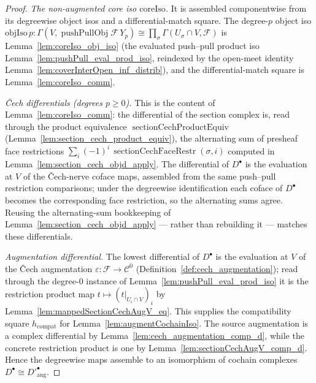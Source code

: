 \begin{proof}
  \emph{The non-augmented core iso \(\mathrm{coreIso}\).} It is assembled componentwise from
  its degreewise object isos and a differential-match square. The degree-\(p\) object iso
  \(\mathrm{objIso}\,p : \Gamma(V,
  \operatorname{pushPullObj}\mathcal{F}\,Y_p) \cong \prod_\sigma \Gamma(U_\sigma \cap V,
  \mathcal{F})\) is Lemma~\ref{lem:coreIso_obj_iso} (the evaluated push--pull product iso
  Lemma~\ref{lem:pushPull_eval_prod_iso}, reindexed by the open-meet identity
  Lemma~\ref{lem:coverInterOpen_inf_distrib}), and the differential-match square is
  Lemma~\ref{lem:coreIso_comm}.

  \emph{{\v C}ech differentials (degrees \(p \geq 0\)).} This is the content of
  Lemma~\ref{lem:coreIso_comm}: the differential of the section complex is, read through the
  product equivalence \(\operatorname{sectionCechProductEquiv}\)
  (Lemma~\ref{lem:section_cech_product_equiv}), the alternating sum of presheaf face
  restrictions \(\sum_i (-1)^i\, \operatorname{sectionCechFaceRestr}(\sigma, i)\) computed in
  Lemma~\ref{lem:section_cech_objd_apply}. The differential of \(D^\bullet\) is the
  evaluation at \(V\) of the {\v C}ech-nerve coface maps, assembled from the same push--pull
  restriction comparisons; under the degreewise identification each coface of \(D^\bullet\)
  becomes the corresponding face restriction, so the alternating sums agree. Reusing the
  alternating-sum bookkeeping of Lemma~\ref{lem:section_cech_objd_apply} --- rather than
  rebuilding it --- matches these differentials.

  \emph{Augmentation differential.} The lowest differential of \(D^\bullet\) is the evaluation
  at \(V\) of the {\v C}ech augmentation \(\varepsilon : \mathcal{F} \to \mathcal{C}^0\)
  (Definition~\ref{def:cech_augmentation}); read through the degree-\(0\) instance of
  Lemma~\ref{lem:pushPull_eval_prod_iso} it is the restriction product map
  \(t \mapsto (t|_{U_i \cap V})_i\) by
  Lemma~\ref{lem:mappedSectionCechAugV_eq}. This supplies the compatibility square
  \(h_{\mathrm{compat}}\) for Lemma~\ref{lem:augmentCochainIso}. The source augmentation is a
  complex differential by Lemma~\ref{lem:cech_augmentation_comp_d}, while the concrete
  restriction product is one by Lemma~\ref{lem:sectionCechAugV_comp_d}. Hence the degreewise maps
  assemble to an
  isomorphism of cochain complexes \(D^\bullet \cong D'^\bullet_{\mathrm{aug}}\).
\end{proof}

